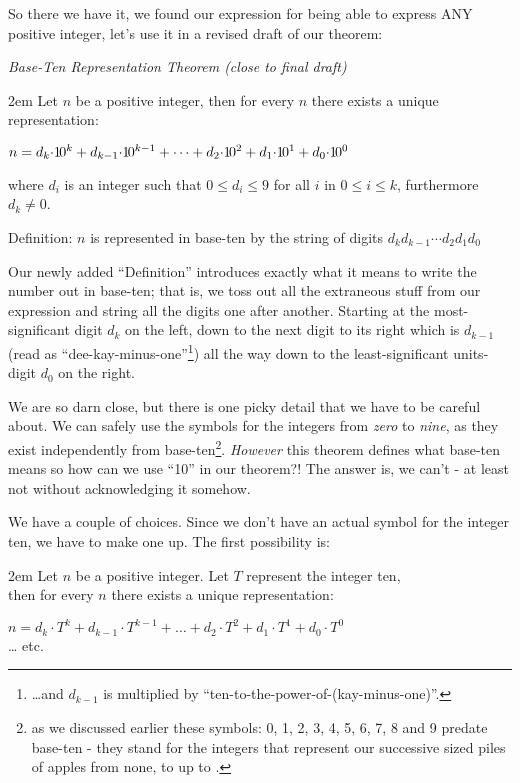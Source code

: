 \documentclass{article}
\newenvironment{jprIn}{\begin{adjustwidth}{2em}{}}{\end{adjustwidth}}
\begin{document}
So there we have it, we found our expression for being able to express ANY positive integer, let's use
it in a revised draft of our theorem:

\emph{Base-Ten Representation Theorem (close to final draft)}
\begin{jprIn}
Let $n$ be a positive integer, then for every $n$ there exists a unique representation:

\hspace{3em}$n=d_k{\cdot}{1\hspace{-0.12em}0}^k+d_{k-1}{\cdot}{1\hspace{-0.12em}0}^{k-1}+\dots+d_2{\cdot}{1\hspace{-0.12em}0}^2+d_1{\cdot}{1\hspace{-0.12em}0}^1+d_0{\cdot}{1\hspace{-0.12em}0}^0$

where $d_i$ is an integer such that $0\le{}d_i\le{}9$ for all $i$ in $0\le{}i\le{}k$, furthermore $d_k\ne0$.

Definition: $n$ is represented in base-ten by the string of digits $d_kd_{k-1}{\cdots}d_2d_1d_0$
\end{jprIn}

Our newly added ``Definition'' introduces exactly what it means to write the number out in base-ten; that is,
we toss out all the extraneous stuff from our expression
and string all the digits one after another.
Starting at the most-significant digit $d_k$ on the left, down to the next digit to its right which is $d_{k-1}$
(read as ``dee-kay-minus-one''\footnote{\dots{}and $d_{k-1}$ is multiplied by ``ten-to-the-power-of-(kay-minus-one)''.})
all the way down to the least-significant units-digit $d_0$ on the right.

We are so darn close, but there is one picky detail that we have to be careful about.
We can safely use the symbols 
for the integers from \emph{zero} to \emph{nine}, as they exist independently from base-ten\footnote{as we discussed earlier
these symbols: 0, 1, 2, 3, 4, 5, 6, 7, 8 and 9 predate base-ten - they stand for the integers that represent our successive
sized piles of apples from none, to \faApple{} up
to \faApple{}\faApple{}\faApple{}\faApple{}\faApple{}\faApple{}\faApple{}\faApple{}\faApple{}.}. \emph{However} this
theorem defines what base-ten means so how can we use ``10'' in our theorem?!
The answer is, we can't - at least not without acknowledging it somehow.

We have a couple of choices.  Since we don't have an actual symbol for the integer ten, we have to make one up. The first possibility is:
\begin{jprIn}
Let $n$ be a positive integer.  Let $T$ represent the integer ten,\\
then for every $n$ there exists a unique representation:

\hspace{3em}$n=d_k{\cdot}{T}^k+d_{k-1}{\cdot}{T}^{k-1}+\dots+d_2{\cdot}{T}^2+d_1{\cdot}{T}^1+d_0{\cdot}{T}^0$\\
\dots{} etc.
\end{jprIn}
\end{document}
